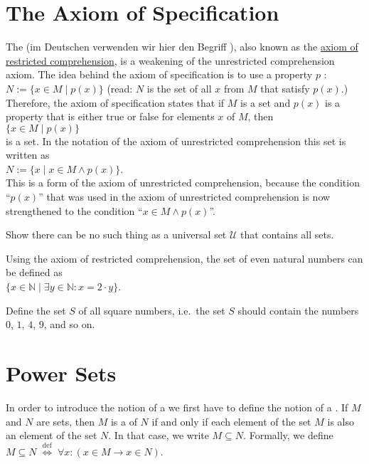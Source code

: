 \section{The Axiom of Specification}
The  
(im Deutschen verwenden wir hier den Begriff ),
also known as the 
\href{https://en.wikipedia.org/wiki/Axiom_schema_of_specification}{axiom of restricted comprehension},
is a weakening of the unrestricted comprehension axiom.  The idea behind the axiom of specification
is to use a property $p$ : 
\\[0.2cm]
\hspace*{1.3cm}
$N := \{ x\in M \;|\; p(x) \}$ \qquad (read: $N$ is the set of all $x$ from $M$ that satisfy $p(x)$.)
\\[0.2cm]
Therefore,  the axiom of specification states that if $M$ is a set and $p(x)$ is a property that is either true
or false for elements $x$ of $M$, then 
\\[0.2cm]
\hspace*{1.3cm}
$\{ x\in M \;|\; p(x) \}$ 
\\[0.2cm]
is a set.  In the notation of the axiom of unrestricted comprehension this set is written as 
\\[0.2cm]
\hspace*{1.3cm}
$N := \{ x \mid x \in M \wedge p(x) \}$. 
\\[0.2cm]
This is a  form of the axiom of unrestricted comprehension, because the condition ``$p(x)$''
that was used in the axiom of unrestricted comprehension is now strengthened to the condition ``$x \in M \wedge p(x)$''.

\exerciseEng
Show there can be no such thing as a universal set $\mathcal{U}$ that contains all sets.
\eox

\exampleEng
Using the axiom of restricted comprehension, the set of even natural numbers can be defined as 
\\[0.2cm]
\hspace*{1.3cm}
 $\{ x \in \mathbb{N} \;|\; \exists y\in \mathbb{N}: x = 2 \cdot y \}$. 

\exerciseEng
Define the set $S$ of all square numbers, i.e.~the set $S$ should contain the numbers $0$, $1$, $4$, $9$, and
so on.
\eox

\section{Power Sets}
In order to introduce the notion of a  we first have to define the notion of a .
If $M$ and $N$ are sets, then $M$ is a  of $N$ if and only if each element of the
set $M$ is also an element of the set $N$.  In that case, we write $M \subseteq N$.  Formally, we define
 \\[0.2cm]
\hspace*{1.3cm}
$M \subseteq N \;\stackrel{\mathrm{def}}{\Longleftrightarrow}\; \forall x: (x \in M \rightarrow x \in N)$.

